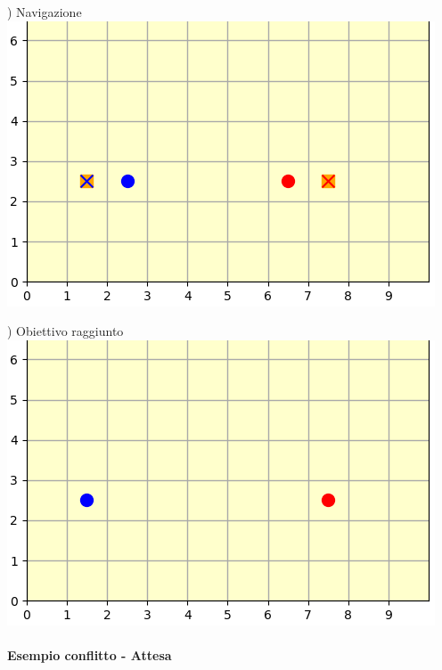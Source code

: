\documentclass[12pt]{article}
\begin{document}
\noindent\begin{minipage}[ht]{0.45\linewidth}
) Navigazione
\includegraphics[width=\textwidth]{SimulazioniNavigazione/2AGV_ConflittoStandard/4.png}
\end{minipage}
\begin{minipage}[ht]{0.45\linewidth}
) Obiettivo raggiunto
\includegraphics[width=\textwidth]{SimulazioniNavigazione/2AGV_ConflittoStandard/5.png}
\end{minipage}

\newpage

\paragraph{Esempio conflitto - Attesa}
\vspace{0.2cm}
\end{document}
